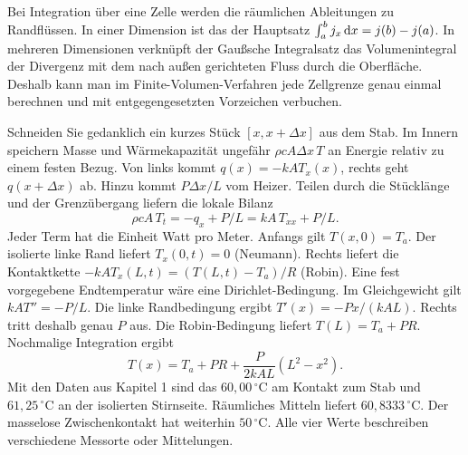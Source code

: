 Bei Integration über eine Zelle werden die räumlichen Ableitungen zu Randflüssen. In einer Dimension ist das der Hauptsatz \(\int_a^b j_x\,\mathrm{d} x=j(b)-j(a)\). In mehreren Dimensionen verknüpft der Gaußsche Integralsatz das Volumenintegral der Divergenz mit dem nach außen gerichteten Fluss durch die Oberfläche. Deshalb kann man im Finite-Volumen-Verfahren jede Zellgrenze genau einmal berechnen und mit entgegengesetzten Vorzeichen verbuchen.

Schneiden Sie gedanklich ein kurzes Stück \([x,x+\Delta x]\) aus dem Stab. Im Innern speichern Masse und Wärmekapazität ungefähr \(\rho c A\Delta x\,T\) an Energie relativ zu einem festen Bezug. Von links kommt \(q(x)=-kA T_x(x)\), rechts geht \(q(x+\Delta x)\) ab. Hinzu kommt \(P\Delta x/L\) vom Heizer. Teilen durch die Stücklänge und der Grenzübergang liefern die lokale Bilanz
\[
 \rho cA\,T_t=-q_x+P/L=kA\,T_{xx}+P/L .
\]
Jeder Term hat die Einheit Watt pro Meter. Anfangs gilt \(T(x,0)=T_a\). Der isolierte linke Rand liefert \(T_x(0,t)=0\) (Neumann). Rechts liefert die Kontaktkette \(-kA T_x(L,t)=(T(L,t)-T_a)/R\) (Robin). Eine fest vorgegebene Endtemperatur wäre eine Dirichlet-Bedingung.
Im Gleichgewicht gilt \(kA T''=-P/L\). Die linke Randbedingung ergibt \(T'(x)=-Px/(kAL)\). Rechts tritt deshalb genau \(P\) aus. Die Robin-Bedingung liefert \(T(L)=T_a+PR\). Nochmalige Integration ergibt
\[
 T(x)=T_a+PR+\frac{P}{2kAL}(L^2-x^2).
\]
Mit den Daten aus Kapitel 1 sind das \(60{,}00\,^\circ\mathrm C\) am Kontakt zum Stab und \(61{,}25\,^\circ\mathrm C\) an der isolierten Stirnseite. Räumliches Mitteln liefert \(60{,}8333\,^\circ\mathrm C\). Der masselose Zwischenkontakt hat weiterhin \(50\,^\circ\mathrm C\). Alle vier Werte beschreiben verschiedene Messorte oder Mittelungen.

